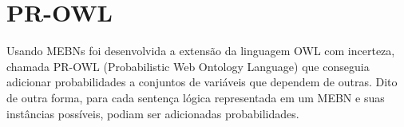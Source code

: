 \section{PR-OWL}
\label{sec:pr_owl}

Usando MEBNs foi desenvolvida a extensão da linguagem OWL com incerteza, chamada PR-OWL (Probabilistic Web Ontology Language) que conseguia adicionar probabilidades a conjuntos de variáveis que dependem de outras. Dito de outra forma, para cada sentença lógica representada em um MEBN e suas instâncias possíveis, podiam ser adicionadas probabilidades.